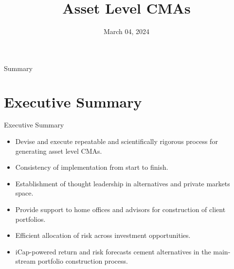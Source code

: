 \documentclass[dvipsnames,mathserif, handout]{beamer}
\begin{document}
\rightskip\rightmargin
\title{Asset Level CMAs}
\author{ \Large \textbf{} }
\footnotesize{\date{March 04, 2024 }


\begin{frame}
	\maketitle
\end{frame}

\begin{frame}{Summary}
	\footnotesize \tableofcontents
\end{frame}

\section{Executive Summary}

\begin{frame}{Executive Summary}
	\begin{description}
		\item[Objective] 
		\begin{itemize}
			\item Devise and execute repeatable and scientifically rigorous process for generating asset level CMAs.
		\end{itemize} \pause
		\item[Benefits] 
		\begin{itemize}
			\item Consistency of implementation from start to finish. \pause
			\item Establishment of thought leadership in alternatives and private markets space. \pause
			\item Provide support to home offices and advisors for construction of client portfolios.
		\end{itemize} \pause
		\item[Strategic Impact]
		\begin{itemize}
			\item Efficient allocation of risk across investment opportunities. \pause
			\item iCap-powered return and risk forecasts cement alternatives in the main-stream portfolio construction process.
		\end{itemize}
	\end{description}
\end{frame}

}
\end{document}
